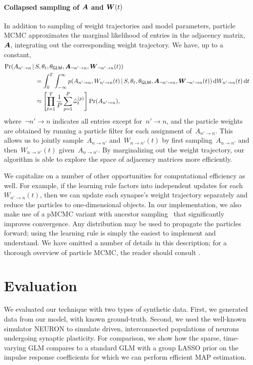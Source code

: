 \paragraph{Collapsed sampling of $\boldsymbol{A}$ and $\boldsymbol{W}(t)$}
In addition to sampling of weight trajectories and model parameters, particle MCMC approximates the marginal likelihood of entries in the adjacency matrix,~$\boldsymbol{A}$, integrating out the corresponding weight trajectory. We have, up to a constant, 
\begin{align*}
\Pr(A_{n'\to n} \,|\, &S, \theta_\ell, \theta_{\mathsf{GLM}}, \boldsymbol{A}_{\neg n' \to n}, \boldsymbol{W}_{\neg n' \to n}(t)) \\
&= \int_{0}^{T} \int_{-\infty}^{\infty} p( A_{n'\to n}, W_{n' \to n}(t) \,|\, S, \theta_\ell, \theta_{\mathsf{GLM}}, \boldsymbol{A}_{\neg n' \to n}, \boldsymbol{W}_{\neg n' \to n}(t))\, \mathrm{d}W_{n' \to n}(t)\, \mathrm{d}t\\
&\approx \left[\prod_{t=1}^T \frac{1}{P} \sum_{p=1}^P  \hat{\omega}^{(p)}_t \right] \Pr(A_{n'\to n}),
\end{align*}
where~${\neg n'\to n}$ indicates all entries except for~${n' \to n}$, and the particle weights are obtained by running a particle filter for each assignment of~$A_{n' \to n}$.
This allows us to jointly sample~$A_{n \to n'}$ and~${W_{n \to n'}(t)}$ by first sampling~${A_{n \to n'}}$ and then~${W_{n \to n'}(t)}$ given~${A_{n \to n'}}$. By marginalizing out the weight trajectory, our algorithm is able to explore the space of adjacency matrices more efficiently. 

We capitalize on a number of other opportunities for computational efficiency as well. For example, if the learning rule factors into independent updates for each~$W_{n' \to n}(t)$, then we can update each synapse's weight trajectory separately and reduce the particles to one-dimensional objects. In our implementation, we also make use of a pMCMC variant with ancestor sampling~\cite{Lindsten-2012} that significantly improves convergence. Any distribution may be used to propagate the particles forward; using the learning rule is simply the easiest to implement and understand.   We have omitted a number of details in this description; for a thorough overview of particle MCMC, the reader should consult \cite{Andrieu-2010, Lindsten-2012}.


\section{Evaluation}
We evaluated our technique with two types of synthetic data. First, we generated data from our model, with known ground-truth. Second, we used the well-known simulator NEURON to simulate driven, interconnected populations of neurons undergoing synaptic plasticity. For comparison, we show how the sparse, time-varying GLM compares to a standard GLM with a group LASSO prior on the impulse response coefficients for which we can perform efficient MAP estimation.

